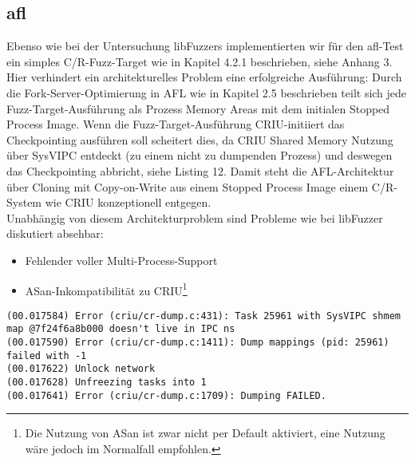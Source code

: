 \documentclass[a4paper]{article}
\begin{document}
\subsection{afl}
Ebenso wie bei der Untersuchung libFuzzers implementierten wir für den afl-Test ein simples C/R-Fuzz-Target wie in Kapitel 4.2.1 beschrieben, siehe Anhang 3.\\
Hier verhindert ein architekturelles Problem eine erfolgreiche Ausführung:
Durch die Fork-Server-Optimierung in AFL wie in Kapitel 2.5 beschrieben teilt sich jede Fuzz-Target-Ausführung als Prozess Memory Areas mit dem initialen Stopped Process Image. 
Wenn die Fuzz-Target-Ausführung CRIU-initiiert das Checkpointing ausführen soll scheitert dies, da CRIU Shared Memory Nutzung über SysVIPC entdeckt (zu einem nicht zu dumpenden Prozess) und deswegen das Checkpointing abbricht, siehe Listing 12.
Damit steht die AFL-Architektur über Cloning mit Copy-on-Write aus einem Stopped Process Image einem C/R-System wie CRIU konzeptionell entgegen.\\
Unabhängig von diesem Architekturproblem sind Probleme wie bei libFuzzer diskutiert absehbar:
\begin{itemize}
    \item Fehlender voller Multi-Process-Support
    \item ASan-Inkompatibilität zu CRIU\footnote{Die Nutzung von ASan ist zwar nicht per Default aktiviert, eine Nutzung wäre jedoch im Normalfall empfohlen.}
\end{itemize}

\begin{lstlisting}[caption=Checkpointing Error durch Shared Memory]
(00.017584) Error (criu/cr-dump.c:431): Task 25961 with SysVIPC shmem map @7f24f6a8b000 doesn't live in IPC ns
(00.017590) Error (criu/cr-dump.c:1411): Dump mappings (pid: 25961) failed with -1
(00.017622) Unlock network
(00.017628) Unfreezing tasks into 1
(00.017641) Error (criu/cr-dump.c:1709): Dumping FAILED.
\end{lstlisting}
\end{document}

